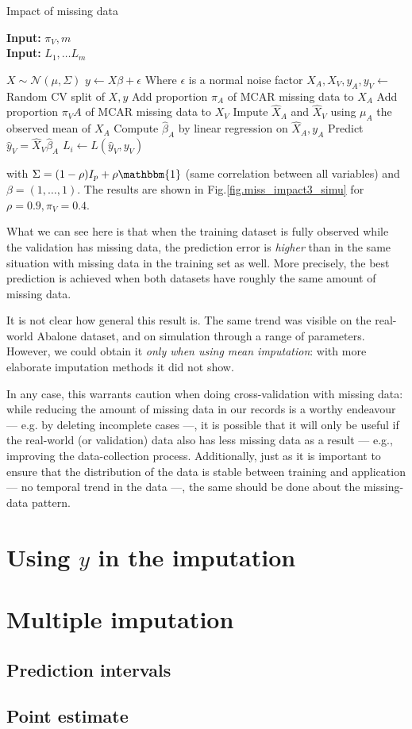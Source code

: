 \begin{algorithm}[H]
	\caption{Impact of missing data}
	\hspace*{\algorithmicindent} \textbf{Input:} $\pi_V, m$  \\
	\hspace*{\algorithmicindent} \textbf{Input:} $L_1, \ldots L_m$  \\
	\begin{algorithmic}[1]
		\State $X \sim \mathcal{N}(\mu,\Sigma)$
		\State $y \leftarrow X \beta + \epsilon$ \Comment Where $\epsilon$ is a normal noise factor
		\State $X_A, X_V, y_A, y_V \leftarrow$ Random CV split of $X,y$
			\State Add proportion $\pi_A$ of MCAR missing data to $X_A$
			\State Add proportion $\pi_VA$ of MCAR missing data to $X_V$
			\State Impute $\hat{X}_A$ and $\hat{X}_V$ using $\mu_A$ the observed mean of $X_A$
			\State Compute $\hat{\beta}_A$ by linear regression on $\hat{X}_A, y_A$
			\State Predict $\hat{y}_V = \hat{X}_V \hat{\beta}_A$
			\State $L_i \leftarrow L(\hat{y}_V, y_V)$
		\EndFor
	\end{algorithmic}
\end{algorithm}

with $\Sigma = (1-\rho) I_p + \rho \mathbbm{1}$ (same correlation between all variables) and $\beta=(1,\ldots,1)$. The results are shown in Fig.\ref{fig.miss_impact3_simu} for $\rho=0.9, \pi_V=0.4$.



What we can see here is that when the training dataset is fully observed while the validation has missing data, the prediction error is \emph{higher} than in the same situation with missing data in the training set as well. More precisely, the best prediction is achieved when both datasets have roughly the same amount of missing data.

It is not clear how general this result is. The same trend was visible on the real-world Abalone dataset, and on simulation through a range of parameters. However, we could obtain it \emph{only when using mean imputation}: with more elaborate imputation methods it did not show.

 In any case, this warrants caution when doing cross-validation with missing data: while reducing the amount of missing data in our records is a worthy endeavour --- e.g. by deleting incomplete cases ---, it is possible that it will only be useful if the real-world (or validation) data also has less missing data as a result --- e.g., improving the data-collection process. Additionally, just as it is important to ensure that the distribution of the data is stable between training and application --- no temporal trend in the data ---, the same should be done about the missing-data pattern.
	\section{Using $y$ in the imputation}
	\section{Multiple imputation}
		\subsection{Prediction intervals}
		\subsection{Point estimate}